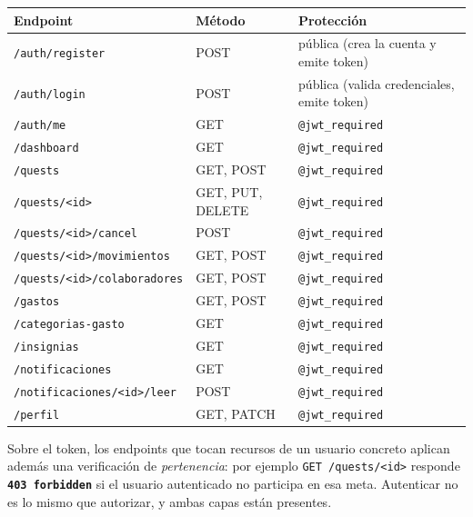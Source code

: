 \documentclass[11pt,letterpaper]{article}
\newcommand{\http}[2]{\textcolor{#1}{\texttt{\textbf{#2}}}}
\begin{document}
\begin{center}
\begin{tabular}{@{}l l l@{}}
\toprule
\textbf{Endpoint} & \textbf{Método} & \textbf{Protección} \\
\midrule
\texttt{/auth/register} & POST & pública (crea la cuenta y emite token) \\
\texttt{/auth/login}    & POST & pública (valida credenciales, emite token) \\
\midrule
\texttt{/auth/me}                            & GET            & \texttt{@jwt\_required} \\
\texttt{/dashboard}                          & GET            & \texttt{@jwt\_required} \\
\texttt{/quests}                             & GET, POST      & \texttt{@jwt\_required} \\
\texttt{/quests/<id>}                        & GET, PUT, DELETE & \texttt{@jwt\_required} \\
\texttt{/quests/<id>/cancel}                 & POST           & \texttt{@jwt\_required} \\
\texttt{/quests/<id>/movimientos}            & GET, POST      & \texttt{@jwt\_required} \\
\texttt{/quests/<id>/colaboradores}          & GET, POST      & \texttt{@jwt\_required} \\
\texttt{/gastos}                             & GET, POST      & \texttt{@jwt\_required} \\
\texttt{/categorias-gasto}                   & GET            & \texttt{@jwt\_required} \\
\texttt{/insignias}                          & GET            & \texttt{@jwt\_required} \\
\texttt{/notificaciones}                     & GET            & \texttt{@jwt\_required} \\
\texttt{/notificaciones/<id>/leer}           & POST           & \texttt{@jwt\_required} \\
\texttt{/perfil}                             & GET, PATCH     & \texttt{@jwt\_required} \\
\bottomrule
\end{tabular}
\end{center}

Sobre el token, los endpoints que tocan recursos de un usuario concreto aplican además una
verificación de \emph{pertenencia}: por ejemplo \texttt{GET /quests/<id>} responde
\http{qcRed}{403 forbidden} si el usuario autenticado no participa en esa meta. Autenticar
no es lo mismo que autorizar, y ambas capas están presentes.
\end{document}
